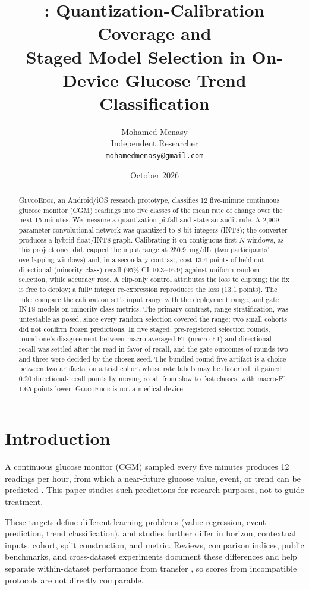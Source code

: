 \documentclass[10pt,twocolumn]{article}
\title{\project: Quantization-Calibration Coverage and\\
Staged Model Selection in On-Device Glucose Trend Classification}
\author{Mohamed Menasy\\
Independent Researcher\\
\texttt{mohamedmenasy@gmail.com}}
\date{October 2026}
\newcommand{\mgdl}{\ensuremath{\mathrm{mg/dL}}}
\newcommand{\project}{\textsc{GlucoEdge}\xspace}
\begin{document}
\maketitle

\begin{abstract}
\project, an Android/iOS research prototype, classifies 12 five-minute
continuous glucose monitor (CGM) readings into five classes of the mean
rate of change over the next 15 minutes. We measure a quantization pitfall
and state an audit rule. A 2,909-parameter convolutional network was
quantized to 8-bit integers (INT8); the converter produces a hybrid
float/INT8 graph. Calibrating it on contiguous first-$N$ windows, as this
project once did, capped the input range at 250.9~\mgdl\ (two
participants' overlapping windows) and, in a secondary contrast, cost 13.4
points of
held-out directional (minority-class) recall (95\% CI 10.3--16.9) against
uniform random selection, while accuracy rose. A clip-only control
attributes the loss to clipping; the fix is free to deploy; a fully
integer re-expression reproduces the loss (13.1 points). The rule: compare
the calibration set's input range with the deployment range, and gate
INT8 models on minority-class metrics. The primary contrast, range
stratification, was untestable as posed, since every random selection
covered the range; two small cohorts did not confirm frozen predictions.
In five staged, pre-registered selection rounds, round one's disagreement
between macro-averaged F1 (macro-F1) and directional recall was settled
after the read in favor of recall, and the gate outcomes of rounds two and
three were decided by the chosen seed. The bundled round-five artifact is a choice between two
artifacts: on a trial cohort whose rate labels may be distorted, it gained
0.20 directional-recall points by moving recall from slow to fast classes,
with macro-F1 1.65 points lower. \project is not a medical device.
\end{abstract}

\section{Introduction}

A continuous glucose monitor (CGM) sampled every five minutes produces 12
readings per hour, from which a near-future glucose value, event, or trend
can be predicted \cite{sergazinov2024glucobench}. This paper studies such
predictions for research purposes, not to guide treatment.

These targets define different learning problems (value regression, event
prediction, trend classification), and studies further differ in horizon,
contextual inputs, cohort, split construction, and metric. Reviews,
comparison indices, public benchmarks, and cross-dataset experiments
document these differences and help separate within-dataset performance
from transfer \cite{liu2023systematic,facchinetti2011index,
sergazinov2024glucobench,ghimire2024generalize}, so scores from
incompatible protocols are not directly comparable.
\end{document}

